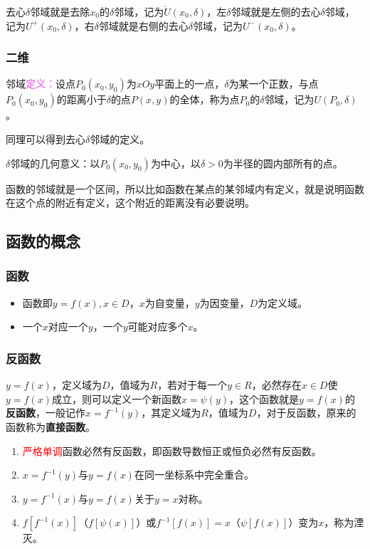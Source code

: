 \documentclass[UTF8, 12pt]{ctexart}
\begin{document}
        去心$\delta$邻域就是去除$x_0$的$\delta$邻域，记为$\mathring{U}(x_0,\delta)$，左$\delta$邻域就是左侧的去心$\delta$邻域，记为$U^+(x_0,\delta)$，右$\delta$邻域就是右侧的去心$\delta$邻域，记为$U^-(x_0,\delta)$。

        \subsubsection{二维}

        邻域\textcolor{violet}{\textbf{定义：}}设点$P_0(x_0,y_0)$为$xOy$平面上的一点，$\delta$为某一个正数，与点$P_0(x_0,y_0)$的距离小于$\delta$的点$P(x,y)$的全体，称为点$P_0$的$\delta$邻域，记为$U(P_0,\delta)$。

        同理可以得到去心$\delta$邻域的定义。

        $\delta$邻域的几何意义：以$P_0(x_0,y_0)$为中心，以$\delta>0$为半径的圆内部所有的点。

        函数的邻域就是一个区间，所以比如函数在某点的某邻域内有定义，就是说明函数在这个点的附近有定义，这个附近的距离没有必要说明。

        \subsection{函数的概念}
        \subsubsection{函数}

        \begin{itemize}
            \item 函数即$y=f(x),x\in D$，$x$为自变量，$y$为因变量，$D$为定义域。
            \item 一个$x$对应一个$y$，一个$y$可能对应多个$x$。
        \end{itemize}
        \subsubsection{反函数}

        $y=f(x)$，定义域为$D$，值域为$R$，若对于每一个$y\in R$，必然存在$x\in D$使$y=f(x)$成立，则可以定义一个新函数$x=\psi(y)$，这个函数就是$y=f(x)$的\textbf{反函数}，一般记作$x=f^{-1}(y)$，其定义域为$R$，值域为$D$，对于反函数，原来的函数称为\textbf{直接函数}。
        \begin{enumerate}
            \item \textcolor{red}{严格单调}函数必然有反函数，即函数导数恒正或恒负必然有反函数。
            \item $x=f^{-1}(y)$与$y=f(x)$在同一坐标系中完全重合。
            \item $y=f^{-1}(x)$与$y=f(x)$关于$y=x$对称。
            \item $f[f^{-1}(x)]$（$f[\psi(x)]$）或$f^{-1}[f(x)]=x$（$\psi[f(x)]$）变为$x$，称为湮灭。
        \end{enumerate}
\end{document}

